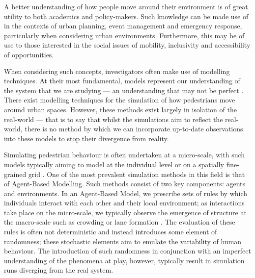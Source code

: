 \documentclass[12pt, twoside, a4paper]{article}
\begin{document}

A better understanding of how people move around their environment is of great
utility to both academics and policy-makers.
Such knowledge can be made use of in the contexts of urban planning, event
management and emergency response, particularly when considering urban
environments.
Furthermore, this may be of use to those interested in the social issues of
mobility, inclusivity and accessibility of opportunities.

When considering such concepts, investigators often make use of modelling
techniques.
At their most fundamental, models represent our understanding of the system that
we are studying --- an understanding that may not be perfect
\citep{stanislaw1986tests}.
There exist modelling techniques for the simulation of how pedestrians move
around urban spaces.
However, these methods exist largely in isolation of the real-world --- that is
to say that whilst the simulations aim to reflect the real-world, there is no
method by which we can incorporate up-to-date observations into these models to
stop their divergence from reality.

Simulating pedestrian behaviour is often undertaken at a micro-scale, with such
models typically aiming to model at the individual level or on a spatially
fine-grained grid \citep{burstedde2001simulation}.
One of the most prevalent simulation methods in this field is that of
Agent-Based Modelling.
Such methods consist of two key components: agents and environments.
In an Agent-Based Model, we prescribe sets of rules by which individuals
interact with each other and their local environment; as interactions take
place on the micro-scale, we typically observe the emergence of structure at the
macro-scale such as crowding \citep{batty2003discrete} or lane formation
\citep{liu2014agent}.
The evaluation of these rules is often not deterministic and instead introduces
some element of randomness; these stochastic elements aim to emulate the
variability of human behaviour.
The introduction of such randomness in conjunction with an imperfect
understanding of the phenomena at play, however, typically result in simulation
runs diverging from the real system.
\end{document}
